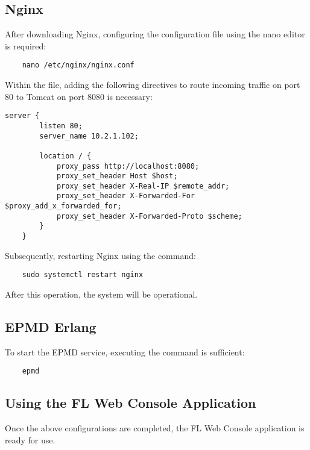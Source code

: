 \subsection{Nginx}
After downloading Nginx, configuring the configuration file using the nano editor is required:
\begin{verbatim}
    nano /etc/nginx/nginx.conf   
\end{verbatim}
Within the file, adding the following directives to route incoming traffic on port 80 to Tomcat on port 8080 is necessary:
\begin{verbatim}
server {
        listen 80;
        server_name 10.2.1.102;  

        location / {
            proxy_pass http://localhost:8080;  
            proxy_set_header Host $host;
            proxy_set_header X-Real-IP $remote_addr;
            proxy_set_header X-Forwarded-For $proxy_add_x_forwarded_for;
            proxy_set_header X-Forwarded-Proto $scheme;
        }
    }
\end{verbatim}
Subsequently, restarting Nginx using the command:
\begin{verbatim}
    sudo systemctl restart nginx
\end{verbatim}
After this operation, the system will be operational.

\subsection{EPMD Erlang}
To start the EPMD service, executing the command is sufficient:
\begin{verbatim}
    epmd
\end{verbatim}

\subsection{Using the FL Web Console Application}
Once the above configurations are completed, the FL Web Console application is ready for use.